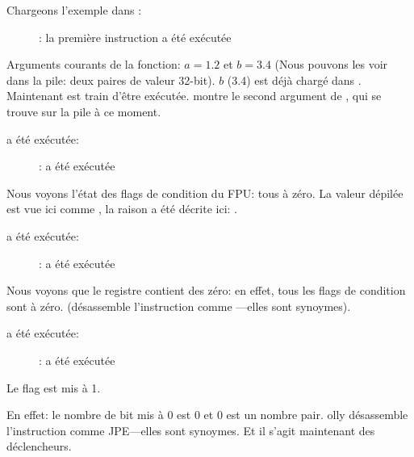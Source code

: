 ﻿\clearpage
{}
\myindex{\olly}

Chargeons l'exemple dans \olly:

\begin{figure}[H]
\centering
{}
\caption{\olly: la première instruction \FLD a été exécutée}
\label{fig:FPU_comparison_case1_olly1}
\end{figure}

Arguments courants de la fonction: $a=1.2$ et $b=3.4$ (Nous pouvons les voir dans
la pile: deux paires de valeur 32-bit).
$b$ (3.4) est déjà chargé dans .
Maintenant \FCOMP est train d'être exécutée.
\olly montre le second argument de \FCOMP, qui se trouve sur la pile à ce moment.

\clearpage
\FCOMP a été exécutée:

\begin{figure}[H]
\centering
{}
\caption{\olly: \FCOMP a été exécutée}
\label{fig:FPU_comparison_case1_olly2}
\end{figure}

Nous voyons l'état des flags de condition du \ac{FPU}: tous à zéro.
La valeur dépilée est vue ici comme , la raison a été décrite ici:
.

\clearpage
\FNSTSW a été exécutée:
\begin{figure}[H]
\centering
{}
\caption{\olly: \FNSTSW a été exécutée}
\label{fig:FPU_comparison_case1_olly3}
\end{figure}

Nous voyons que le registre  contient des zéro: en effet, tous les flags
de condition sont à zéro.
(\olly désassemble l'instruction \FNSTSW comme ---elles sont synoymes).

\clearpage
\TEST a été exécutée:

\begin{figure}[H]
\centering
{}
\caption{\olly: \TEST a été exécutée}
\label{fig:FPU_comparison_case1_olly4}
\end{figure}

Le flag  est mis à 1.

En effet: le nombre de bit mis à 0 est 0 et 0 est un nombre pair.
olly désassemble l'instruction  comme \ac{JPE}---elles sont synoymes.
Et il s'agit maintenant des déclencheurs.

